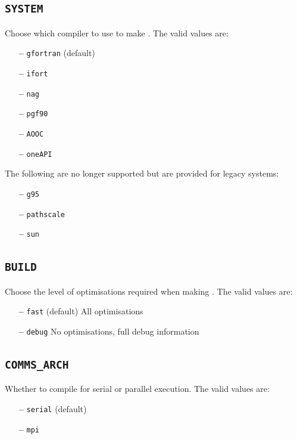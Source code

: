 \documentclass[a4paper,11pt,twoside]{book}
\begin{document}
{\subsection[system]{\tt SYSTEM}

Choose which compiler to use to make \optados. The valid values are:
\begin{itemize}
\item[{\bf --}]  \verb#gfortran# (default)
\item[{\bf --}]  \verb#ifort#
\item[{\bf --}]  \verb#nag#
\item[{\bf --}]  \verb#pgf90#
\item[{\bf --}]  \verb#AOOC#
\item[{\bf --}]  \verb#oneAPI#
\end{itemize}

The following are no longer supported but are provided for legacy systems:
\begin{itemize}
\item[{\bf --}]  \verb#g95# 
\item[{\bf --}]  \verb#pathscale#
\item[{\bf --}]  \verb#sun#
\end{itemize}

\subsection[build]{\tt BUILD}

Choose the level of optimisations required when making \optados.  The valid values are:
\begin{itemize}
\item[{\bf --}]  \verb#fast# (default) All optimisations
\item[{\bf --}]  \verb#debug# No optimisations, full debug information
\end{itemize}

\subsection[comms_arch]{\tt COMMS\_ARCH}

Whether to compile for serial or parallel execution. The valid values are:
\begin{itemize}
\item[{\bf --}]  \verb#serial# (default)
\item[{\bf --}]  \verb#mpi#
\end{itemize}

}
\end{document}
